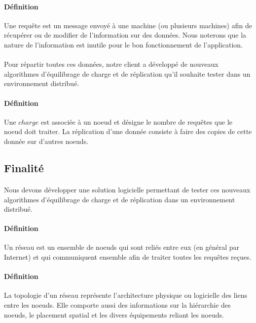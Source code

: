 \documentclass[12pt]{article}
\begin{document}
\paragraph{Définition} Une requête est un message envoyé à une machine (ou plusieurs machines) afin de récupérer ou de modifier de l'information sur des données.
Nous noterons que la nature de l'information est inutile pour le bon fonctionnement de l'application.

\paragraph{} Pour répartir toutes ces données, notre client a développé de nouveaux algorithmes d'équilibrage de charge et de réplication qu'il souhaite tester dans un environnement distribué.

\paragraph{Définition} Une $charge$ est associée à un noeud et désigne le nombre de requêtes que le noeud doit traiter. La réplication d'une donnée consiste à faire des copies de cette donnée sur d'autres noeuds.

\subsection{Finalité}

\paragraph{} Nous devons développer une solution logicielle permettant de tester ces nouveaux algorithmes d'équilibrage de charge et de réplication dans un environnement distribué.

\paragraph{Définition} Un réseau est un ensemble de noeuds qui sont reliés entre eux (en général par Internet) et qui communiquent ensemble afin de traiter toutes les requêtes reçues.

\paragraph{Définition} La topologie d'un réseau représente l'architecture physique ou logicielle des liens entre les noeuds. Elle comporte aussi des informations sur la
 hiérarchie des noeuds, le placement spatial et les divers équipements reliant les noeuds.
\end{document}
